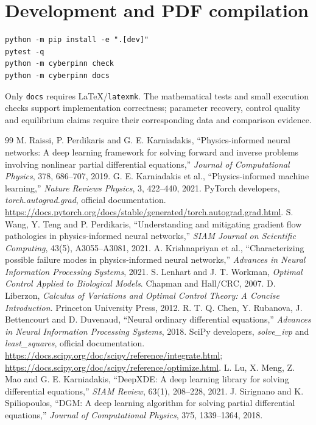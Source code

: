 \documentclass[11pt,a4paper]{article}
\theoremstyle{definition}
\theoremstyle{remark}
\begin{document}
\section{Development and PDF compilation}
\begin{lstlisting}[language={}]
python -m pip install -e ".[dev]"
pytest -q
python -m cyberpinn check
python -m cyberpinn docs
\end{lstlisting}
Only \texttt{docs} requires LaTeX/\texttt{latexmk}. The mathematical tests and small execution checks support implementation correctness; parameter recovery, control quality and equilibrium claims require their corresponding data and comparison evidence.

\clearpage
\begin{thebibliography}{99}
 M. Raissi, P. Perdikaris and G. E. Karniadakis, ``Physics-informed neural networks: A deep learning framework for solving forward and inverse problems involving nonlinear partial differential equations,'' \emph{Journal of Computational Physics}, 378, 686--707, 2019.
 G. E. Karniadakis et al., ``Physics-informed machine learning,'' \emph{Nature Reviews Physics}, 3, 422--440, 2021.
 PyTorch developers, \emph{torch.autograd.grad}, official documentation. \url{https://docs.pytorch.org/docs/stable/generated/torch.autograd.grad.html}.
 S. Wang, Y. Teng and P. Perdikaris, ``Understanding and mitigating gradient flow pathologies in physics-informed neural networks,'' \emph{SIAM Journal on Scientific Computing}, 43(5), A3055--A3081, 2021.
 A. Krishnapriyan et al., ``Characterizing possible failure modes in physics-informed neural networks,'' \emph{Advances in Neural Information Processing Systems}, 2021.
 S. Lenhart and J. T. Workman, \emph{Optimal Control Applied to Biological Models}. Chapman and Hall/CRC, 2007.
 D. Liberzon, \emph{Calculus of Variations and Optimal Control Theory: A Concise Introduction}. Princeton University Press, 2012.
 R. T. Q. Chen, Y. Rubanova, J. Bettencourt and D. Duvenaud, ``Neural ordinary differential equations,'' \emph{Advances in Neural Information Processing Systems}, 2018.
 SciPy developers, \emph{solve\_ivp} and \emph{least\_squares}, official documentation. \url{https://docs.scipy.org/doc/scipy/reference/integrate.html}; \url{https://docs.scipy.org/doc/scipy/reference/optimize.html}.
 L. Lu, X. Meng, Z. Mao and G. E. Karniadakis, ``DeepXDE: A deep learning library for solving differential equations,'' \emph{SIAM Review}, 63(1), 208--228, 2021.
 J. Sirignano and K. Spiliopoulos, ``DGM: A deep learning algorithm for solving partial differential equations,'' \emph{Journal of Computational Physics}, 375, 1339--1364, 2018.


\end{thebibliography}
\end{document}
